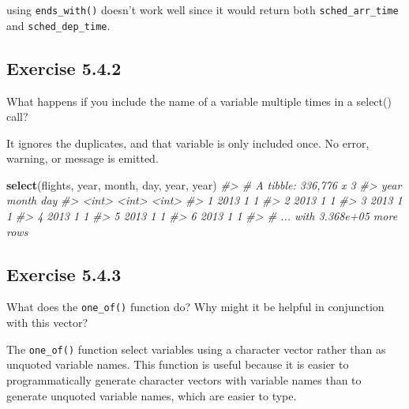 \documentclass[]{book}
\newenvironment{Shaded}{\begin{snugshade}}{\end{snugshade}}
\newcommand{\CommentTok}[1]{\textcolor[rgb]{0.56,0.35,0.01}{\textit{#1}}}
\newcommand{\KeywordTok}[1]{\textcolor[rgb]{0.13,0.29,0.53}{\textbf{#1}}}
\newcommand{\NormalTok}[1]{#1}
\theoremstyle{plain}
\theoremstyle{remark}
\begin{document}
using \texttt{ends\_with()} doesn't work well since it would return both
\texttt{sched\_arr\_time} and \texttt{sched\_dep\_time}.

\hypertarget{exercise-5.4.2}{%
\subsection*{\texorpdfstring{Exercise
{5.4.2}}{Exercise 5.4.2}}\label{exercise-5.4.2}}

What happens if you include the name of a variable multiple times in a
select() call?

It ignores the duplicates, and that variable is only included once. No
error, warning, or message is emitted.

\begin{Shaded}
\begin{Highlighting}[]
\KeywordTok{select}\NormalTok{(flights, year, month, day, year, year)}
\CommentTok{#> # A tibble: 336,776 x 3}
\CommentTok{#>    year month   day}
\CommentTok{#>   <int> <int> <int>}
\CommentTok{#> 1  2013     1     1}
\CommentTok{#> 2  2013     1     1}
\CommentTok{#> 3  2013     1     1}
\CommentTok{#> 4  2013     1     1}
\CommentTok{#> 5  2013     1     1}
\CommentTok{#> 6  2013     1     1}
\CommentTok{#> # ... with 3.368e+05 more rows}
\end{Highlighting}
\end{Shaded}

\hypertarget{exercise-5.4.3}{%
\subsection*{\texorpdfstring{Exercise
{5.4.3}}{Exercise 5.4.3}}\label{exercise-5.4.3}}

What does the \texttt{one\_of()} function do? Why might it be helpful in
conjunction with this vector?

The \texttt{one\_of()} function select variables using a character
vector rather than as unquoted variable names. This function is useful
because it is easier to programmatically generate character vectors with
variable names than to generate unquoted variable names, which are
easier to type.
\end{document}
